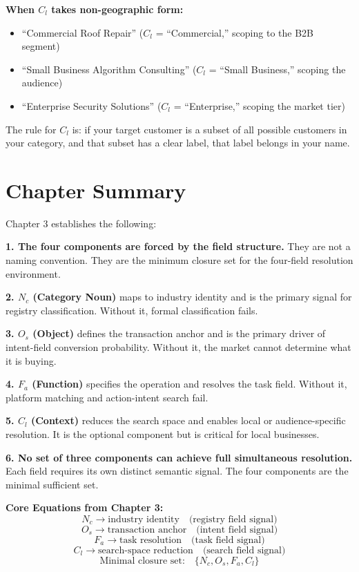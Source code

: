 \documentclass[12pt, openany]{book}
\theoremstyle{thmstyle}
\theoremstyle{defstyle}
\newcommand{\Nc}{N_c}
\newcommand{\Os}{O_s}
\newcommand{\Fa}{F_a}
\newcommand{\Cl}{C_l}
\begin{document}
\textbf{When $\Cl$ takes non-geographic form:}
\begin{itemize}[leftmargin=1.5em]
  \item ``Commercial Roof Repair'' ($\Cl$ = ``Commercial,'' scoping to the B2B segment)
  \item ``Small Business Algorithm Consulting'' ($\Cl$ = ``Small Business,'' scoping the audience)
  \item ``Enterprise Security Solutions'' ($\Cl$ = ``Enterprise,'' scoping the market tier)
\end{itemize}

The rule for $\Cl$ is: if your target customer is a subset of all possible customers in your category, and that subset has a clear label, that label belongs in your name.

\section{Chapter Summary}

Chapter 3 establishes the following:

\textbf{1. The four components are forced by the field structure.} They are not a naming convention. They are the minimum closure set for the four-field resolution environment.

\textbf{2. $N_c$ (Category Noun)} maps to industry identity and is the primary signal for registry classification. Without it, formal classification fails.

\textbf{3. $O_s$ (Object)} defines the transaction anchor and is the primary driver of intent-field conversion probability. Without it, the market cannot determine what it is buying.

\textbf{4. $F_a$ (Function)} specifies the operation and resolves the task field. Without it, platform matching and action-intent search fail.

\textbf{5. $C_l$ (Context)} reduces the search space and enables local or audience-specific resolution. It is the optional component but is critical for local businesses.

\textbf{6. No set of three components can achieve full simultaneous resolution.} Each field requires its own distinct semantic signal. The four components are the minimal sufficient set.

\begin{equationbox}
\textbf{Core Equations from Chapter 3:}
\[
\Nc \rightarrow \text{industry identity} \quad \text{(registry field signal)}
\]
\[
\Os \rightarrow \text{transaction anchor} \quad \text{(intent field signal)}
\]
\[
\Fa \rightarrow \text{task resolution} \quad \text{(task field signal)}
\]
\[
\Cl \rightarrow \text{search-space reduction} \quad \text{(search field signal)}
\]
\[
\text{Minimal closure set:} \quad \{\Nc, \Os, \Fa, \Cl\}
\]
\end{equationbox}
\end{document}
